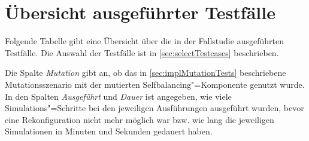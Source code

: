 \chapter{Übersicht ausgeführter Testfälle}
\label{app:overviewExecutedTestCases}

Folgende Tabelle gibt eine Übersicht über die in der Fallstudie ausgeführten Testfälle.
Die Auswahl der Testfälle ist in \autoref{sec:selectTestcases} beschrieben.

Die Spalte \emph{Mutation} gibt an, ob das in \autoref{sec:implMutationTests} beschriebene Mutationsszenario mit der mutierten Selfbalancing"=Komponente genutzt wurde.
In den Spalten \emph{Ausgeführt} und \emph{Dauer} ist angegeben, wie viele Simulations"=Schritte bei den jeweiligen Ausführungen ausgeführt wurden, bevor eine Rekonfiguration nicht mehr möglich war bzw. wie lang die jeweiligen Simulationen in Minuten und Sekunden gedauert haben.

